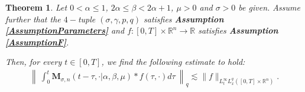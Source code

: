 \documentclass{amsart}
\newtheorem{theorem}{Theorem}[section]
\theoremstyle{definition}
\theoremstyle{remark}
\numberwithin{equation}{section}
\newcommand{\BR}{{\mathbb R}}
\begin{document}
		
		
		
		\begin{theorem}\label{fBoundedProposition}
			Let $0<\alpha\leq 1$, $2\alpha\leq\beta< 2\alpha+1$, $\mu>0$ and $\sigma>0$ be given.
			Assume further that the $4-$tuple $(\sigma,\gamma,p,q)$ satisfies {\bf Assumption \ref{AssumptionParameters}} and
			$f:[0,T]\times \BR^n\longrightarrow \BR$ satisfies
			{\bf Assumption \ref{AssumptionF}}.
			
			Then, for every $t\in[0,T]$, we find the following estimate to hold:
			\begin{eqnarray*}
				\left\|~\displaystyle \int_0^t {\bm M}_{\sigma,n}(t-\tau,\cdot|\alpha,\beta,\mu)\ast  f(\tau,\cdot)d\tau~\right \|_q \lesssim \|f\|_{L^\infty_tL^q_x([0,T]\times\BR^n)}.
			\end{eqnarray*}
		\end{theorem}
		
\end{document}
